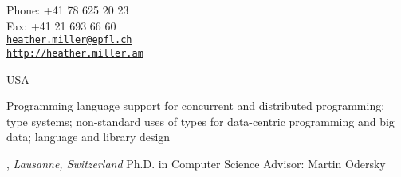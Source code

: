 \documentclass[9pt]{article}
\makeatletter
\def\myemail{heather.miller@epfl.ch}
\def\myweb{http://heather.miller.am}
\def\myfax{+41 21 693 66 60}
\def\myphone{+41 78 625 20 23}
\makeatother
\begin{document}
\begin{minipage}[t]{2.95in}

\end{minipage}
\hfill
\hfill
\begin{minipage}[t]{1.7in}
  \flushright \footnotesize Phone: \myphone \\
  Fax: \myfax  \\
  {\scriptsize  \texttt{\href{mailto:\myemail}{\myemail}}} \\
  {\scriptsize  \vspace{-0.03in} \texttt{\href{\myweb}{\myweb}}}
\end{minipage}


\medskip

\reversemarginpar

\medskip

\medskip
{}

\noindent USA

\bigskip


\noindent Programming language support for concurrent and distributed programming; \\type systems; non-standard uses of types for data-centric programming and big data; language and library design


\bigskip


, \emph{Lausanne, Switzerland} \vspace{0.01in} 
\newline Ph.D. in Computer Science
\newline Advisor: Martin Odersky 
\bigskip
\end{document}
